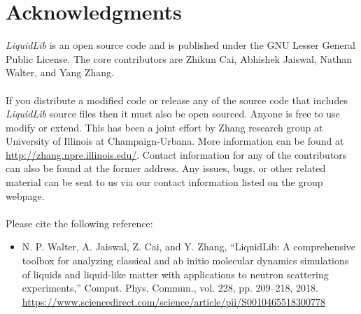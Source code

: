 \documentclass{article}
\begin{document}
\section{Acknowledgments}
\textit{LiquidLib} is an open source code and is published under the GNU Lesser General Public License.  The core contributors are Zhikun Cai, Abhishek Jaiswal, Nathan Walter, and Yang Zhang.   
\\
\\
If you distribute a modified code or release any of the source code that includes \textit{LiquidLib} source files then it must also be open sourced.  Anyone is free to use modify or extend.  This has been a joint effort by Zhang research group at University of Illinois at Champaign-Urbana.  More information can be found at \url{http://zhang.npre.illinois.edu/}.  Contact information for any of the contributors can also be found at the former address. Any issues, bugs, or other related material can be sent to us via our contact information listed on the group webpage.
\\
\\
Please cite the following reference:
\begin{itemize}
	\item N. P. Walter, A. Jaiswal, Z. Cai, and Y. Zhang, “LiquidLib: A comprehensive toolbox for analyzing classical and ab initio molecular dynamics simulations of liquids and liquid-like matter with applications to neutron scattering experiments,” Comput. Phys. Commun., vol. 228, pp. 209–218, 2018. \url{https://www.sciencedirect.com/science/article/pii/S0010465518300778} 
\end{itemize}
\end{document}
